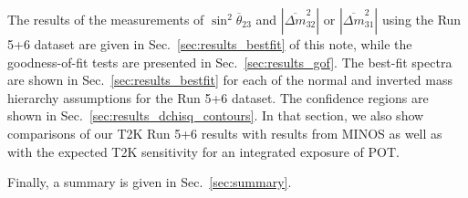The results of the measurements of $\sin^{2}\overline{\theta}_{23}$ and $|\overline{\Delta m}^{2}_{32}|$ 
or $|\overline{\Delta m}^{2}_{31}|$ 
using the Run 5+6 dataset are given in Sec.~\ref{sec:results_bestfit} of this note, 
while the goodness-of-fit tests are presented in Sec.~\ref{sec:results_gof}.
The best-fit spectra are shown in Sec.~\ref{sec:results_bestfit} for each of the normal and inverted mass hierarchy assumptions for the 
Run 5+6 dataset.
The confidence regions are shown in Sec.~\ref{sec:results_dchisq_contours}. 
In that section, we also show comparisons of our T2K Run 5+6 results with results from MINOS
as well as with the expected T2K sensitivity for an integrated exposure of \TotalPot{} POT.

Finally, a summary is given in Sec.~\ref{sec:summary}.  

\clearpage

